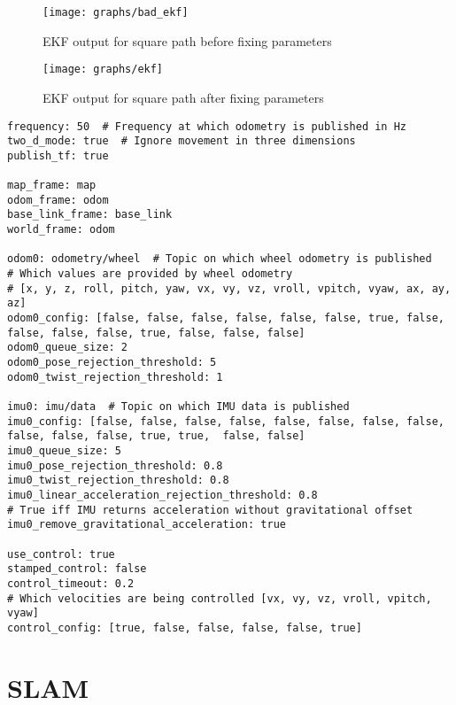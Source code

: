 

\begin{figure}[!ht]
	\centering
	\texttt{[image: graphs/bad\_ekf]}
	\caption{EKF output for square path before fixing parameters}\label{fig:bad_ekf}
\end{figure}


\begin{figure}[!ht]
	\centering
	\texttt{[image: graphs/ekf]}
	\caption{EKF output for square path after fixing parameters}\label{fig:ekf}
\end{figure}



\begin{lstlisting}[caption={EKF YAML file}, label={lst:ekf_yaml}, style=yaml]
frequency: 50  # Frequency at which odometry is published in Hz
two_d_mode: true  # Ignore movement in three dimensions
publish_tf: true

map_frame: map
odom_frame: odom
base_link_frame: base_link
world_frame: odom

odom0: odometry/wheel  # Topic on which wheel odometry is published
# Which values are provided by wheel odometry
# [x, y, z, roll, pitch, yaw, vx, vy, vz, vroll, vpitch, vyaw, ax, ay, az]
odom0_config: [false, false, false, false, false, false, true, false, false, false, false, true, false, false, false]
odom0_queue_size: 2
odom0_pose_rejection_threshold: 5
odom0_twist_rejection_threshold: 1

imu0: imu/data  # Topic on which IMU data is published
imu0_config: [false, false, false, false, false, false, false, false, false, false, false, true, true,  false, false]
imu0_queue_size: 5
imu0_pose_rejection_threshold: 0.8
imu0_twist_rejection_threshold: 0.8
imu0_linear_acceleration_rejection_threshold: 0.8
# True iff IMU returns acceleration without gravitational offset
imu0_remove_gravitational_acceleration: true

use_control: true
stamped_control: false
control_timeout: 0.2
# Which velocities are being controlled [vx, vy, vz, vroll, vpitch, vyaw]
control_config: [true, false, false, false, false, true]
\end{lstlisting}





\section{SLAM}\label{soft/SLAM}

